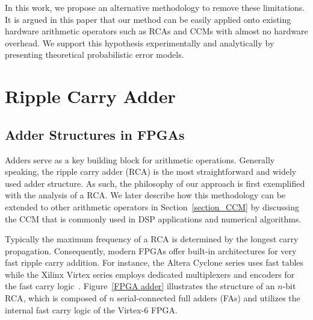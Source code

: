 \documentclass[journal]{IEEEtran}
\begin{document}
In this work, we propose an alternative methodology to remove these limitations. It is argued in this paper that our method can be easily applied onto existing hardware arithmetic operators such as RCAs and CCMs with almost no hardware overhead. We support this hypothesis experimentally and analytically by presenting theoretical probabilistic error models.







\section{Ripple Carry Adder}\label{section_RCA}
\subsection{Adder Structures in FPGAs}
Adders serve as a key building block for arithmetic operations. Generally speaking, the ripple carry adder (RCA) is the most straightforward and widely used adder structure. As such, the philosophy of our approach is first exemplified with the analysis of a RCA. We later describe how this methodology can be extended to other arithmetic operators in Section~\ref{section_CCM} by discussing  the CCM that is commonly used in DSP applications and numerical algorithms.

Typically the maximum frequency of a RCA is determined by the longest carry propagation. Consequently, modern FPGAs offer built-in architectures for very fast ripple carry addition. For instance, the Altera Cyclone series uses fast tables~\cite{AlteraCyclone} while the Xilinx Virtex series employs dedicated multiplexers and encoders for the fast carry logic~\cite{Virtex6}. Figure~\ref{FPGA adder} illustrates the structure of an $n$-bit RCA, which is composed of $n$ serial-connected full adders (FAs) and utilizes the internal fast carry logic of the Virtex-6 FPGA.
\end{document}
